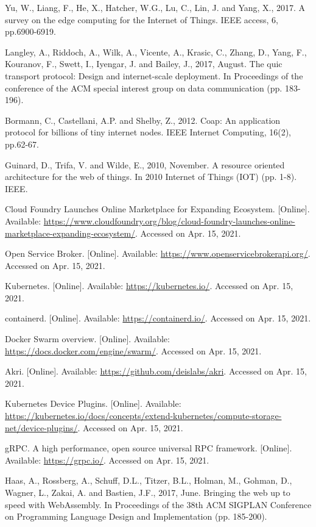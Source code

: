 \begin{thebibliography}{00}
 Yu, W., Liang, F., He, X., Hatcher, W.G., Lu, C., Lin, J. and Yang, X., 2017. A survey on the edge computing for the Internet of Things. IEEE access, 6, pp.6900-6919.

 Langley, A., Riddoch, A., Wilk, A., Vicente, A., Krasic, C., Zhang, D., Yang, F., Kouranov, F., Swett, I., Iyengar, J. and Bailey, J., 2017, August. The quic transport protocol: Design and internet-scale deployment. In Proceedings of the conference of the ACM special interest group on data communication (pp. 183-196).

 Bormann, C., Castellani, A.P. and Shelby, Z., 2012. Coap: An application protocol for billions of tiny internet nodes. IEEE Internet Computing, 16(2), pp.62-67.

 Guinard, D., Trifa, V. and Wilde, E., 2010, November. A resource oriented architecture for the web of things. In 2010 Internet of Things (IOT) (pp. 1-8). IEEE.

 Cloud Foundry Launches Online Marketplace for Expanding Ecosystem. [Online]. Available: \url{https://www.cloudfoundry.org/blog/cloud-foundry-launches-online-marketplace-expanding-ecosystem/}. Accessed on Apr. 15, 2021.

 Open Service Broker. [Online]. Available: \url{https://www.openservicebrokerapi.org/}. Accessed on Apr. 15, 2021.

 Kubernetes. [Online]. Available: \url{https://kubernetes.io/}. Accessed on Apr. 15, 2021.

 containerd. [Online]. Available: \url{https://containerd.io/}. Accessed on Apr. 15, 2021.

 Docker Swarm overview. [Online]. Available: \url{https://docs.docker.com/engine/swarm/}. Accessed on Apr. 15, 2021.

 Akri. [Online]. Available: \url{https://github.com/deislabs/akri}. Accessed on Apr. 15, 2021.

 Kubernetes Device Plugins. [Online]. Available: \url{https://kubernetes.io/docs/concepts/extend-kubernetes/compute-storage-net/device-plugins/}. Accessed on Apr. 15, 2021.

 gRPC. A high performance, open source universal RPC framework. [Online]. Available: \url{https://grpc.io/}. Accessed on Apr. 15, 2021.

 Haas, A., Rossberg, A., Schuff, D.L., Titzer, B.L., Holman, M., Gohman, D., Wagner, L., Zakai, A. and Bastien, J.F., 2017, June. Bringing the web up to speed with WebAssembly. In Proceedings of the 38th ACM SIGPLAN Conference on Programming Language Design and Implementation (pp. 185-200).


\end{thebibliography}
